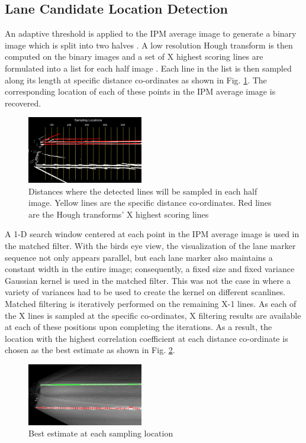 \documentclass{article}
\begin{document}
\subsection{Lane Candidate Location Detection}
An adaptive threshold is applied to the IPM average image to generate a binary image which is split into two halves \cite{borkar_layered_2009}. A low resolution Hough transform is then computed on the binary images and a set of X highest scoring lines are formulated into a list for each half image \cite{borkar_layered_2009}. Each line in the list is then sampled along its length at specific distance co-ordinates as shown in Fig. \ref{fig:sampling_points}. 
The corresponding location of each of these points in the IPM average image is recovered.
\begin{figure}[htb]
  \centering
  \includegraphics[width=0.45\textwidth]{IMG/cand_lane_points.png}
  \caption{Distances where the detected lines will be sampled in each half image. Yellow lines are the specific distance co-ordinates. Red lines are the Hough transforms' X highest scoring lines}
  \label{fig:sampling_points}
\end{figure}
A 1-D search window centered at each point in the IPM average image is used in the matched filter. With the birds eye view, the visualization of the lane marker sequence not only appears parallel, but each lane marker also maintains a constant width in the entire image; consequently, a fixed size and fixed variance Gaussian kernel is used in the matched filter. This was not the case in \cite{borkar_layered_2009} where a variety of variances had to be used to create the kernel on different scanlines. Matched filtering is iteratively performed on the remaining X-1 lines. As each of the X lines is sampled at the specific co-ordinates, X filtering results are available at each of these positions upon completing the iterations. As a result, the location with the highest correlation coefficient at each distance co-ordinate is chosen as the best estimate as shown in Fig. \ref{fig:cand_pts}.
\begin{figure}[htb]
  \centering
  \includegraphics[width=0.45\textwidth]{IMG/cand_lane_points2.png}
  \caption{Best estimate at each sampling location}
  \label{fig:cand_pts}
\end{figure}
\end{document}
